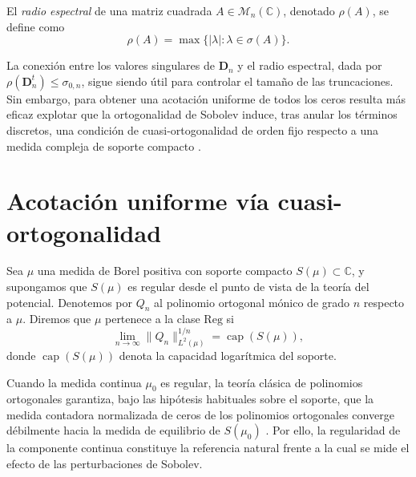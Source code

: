 \begin{defn}\label{def:radio_espectral}
	El \emph{radio espectral} de una matriz cuadrada $A \in \mathcal{M}_n(\mathbb{C})$, denotado $\rho(A)$, se define como
	\[
		\rho(A) = \max\{|\lambda| : \lambda \in \sigma(A)\}.
	\]
\end{defn}

La conexión entre los valores singulares de $\mathbf{D}_n$ y el radio espectral, dada por $\rho(\mathbf{D}_n^t) \le \sigma_{0,n}$, sigue siendo útil para controlar el tamaño de las truncaciones. Sin embargo, para obtener una acotación uniforme de todos los ceros resulta más eficaz explotar que la ortogonalidad de Sobolev induce, tras anular los términos discretos, una condición de cuasi-ortogonalidad de orden fijo respecto a una medida compleja de soporte compacto \cite{lopez1999zero,marcellan2015sobolev}.

\section{Acotación uniforme vía cuasi-ortogonalidad}\label{sec:cuasi_ortogonalidad}

\begin{defn}
	Sea $\mu$ una medida de Borel positiva con soporte compacto $S(\mu) \subset \mathbb{C}$, y supongamos que $S(\mu)$ es regular desde el punto de vista de la teoría del potencial. Denotemos por $Q_n$ al polinomio ortogonal mónico de grado $n$ respecto a $\mu$. Diremos que $\mu$ pertenece a la clase $\mathrm{Reg}$ si
	\begin{equation}
		\lim_{n \to \infty} \|Q_n\|_{L^2(\mu)}^{1/n} = \operatorname{cap}(S(\mu)),
	\end{equation}
	donde $\operatorname{cap}(S(\mu))$ denota la capacidad logarítmica del soporte.
\end{defn}

\begin{rmk}
	Cuando la medida continua $\mu_0$ es regular, la teoría clásica de polinomios ortogonales garantiza, bajo las hipótesis habituales sobre el soporte, que la medida contadora normalizada de ceros de los polinomios ortogonales converge débilmente hacia la medida de equilibrio de $S(\mu_0)$ \cite{stahl1992general}. Por ello, la regularidad de la componente continua constituye la referencia natural frente a la cual se mide el efecto de las perturbaciones de Sobolev.
\end{rmk}

